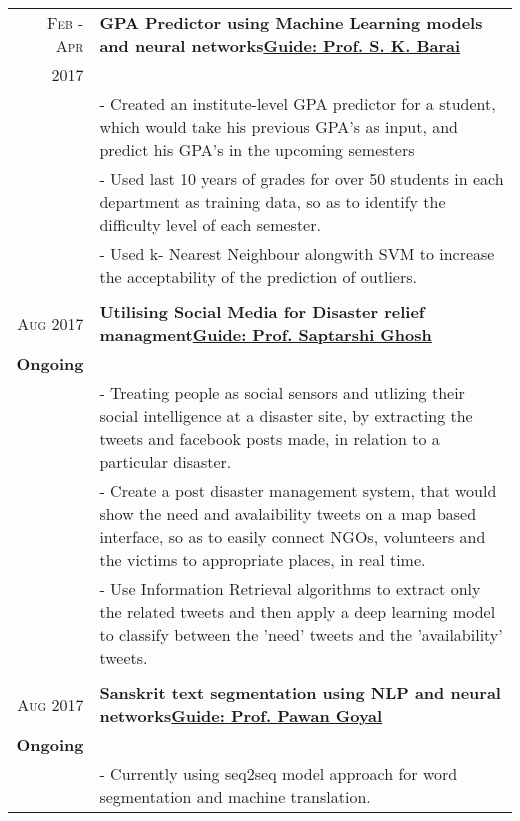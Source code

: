 \documentclass[a4paper,10pt]{extarticle} %
\begin{document}
\begin{tabular}{r|p{18cm}}

\textsc{Feb - Apr} & \textbf{GPA Predictor using Machine Learning models and neural networks}\hfill\textbf{\href{http://www.facweb.iitkgp.ernet.in/~skbarai/}{Guide: Prof. S. K. Barai}}\\
\textsc{2017}\\
& \footnotesize{- Created an institute-level GPA predictor for a student, which would take his previous GPA's as input, and predict his GPA's in the upcoming semesters}\\
& \footnotesize{- Used last 10 years of grades for over 50 students in each department as training data, so as to identify the difficulty level of each semester.}\\
& \footnotesize{- Used	k- Nearest Neighbour alongwith SVM to increase the acceptability of the	prediction of outliers.}\\
\multicolumn{2}{c}{} \\
\textsc{Aug 2017} & \textbf{Utilising Social Media for Disaster relief managment}\hfill\textbf{\href{http://cse.iitkgp.ac.in/~sghosh/}{Guide: Prof. Saptarshi Ghosh}}\\
\textbf{Ongoing}\\
& \footnotesize{- Treating people as social sensors and utlizing their social intelligence at a disaster site, by extracting the tweets and facebook posts made, in relation to a particular disaster.}\\
& \footnotesize{- Create a post disaster management system, that would show the need and avalaibility tweets on a map based interface, so as to easily connect NGOs, volunteers and the victims to appropriate places, in real time.}\\
& \footnotesize{- Use Information Retrieval algorithms to extract only the related tweets and then apply a deep learning model to classify between the 'need' tweets and the 'availability' tweets.}\\
\multicolumn{2}{c}{} \\
\textsc{Aug 2017} & \textbf{Sanskrit text segmentation using NLP and neural networks}\hfill\textbf{\href{http://cse.iitkgp.ac.in/~pawang/}{Guide: Prof. Pawan Goyal}}\\
\textbf{Ongoing}\\
& \footnotesize{- Currently using seq2seq model approach for word segmentation and machine translation.}\\

\end{tabular}
\end{document}
